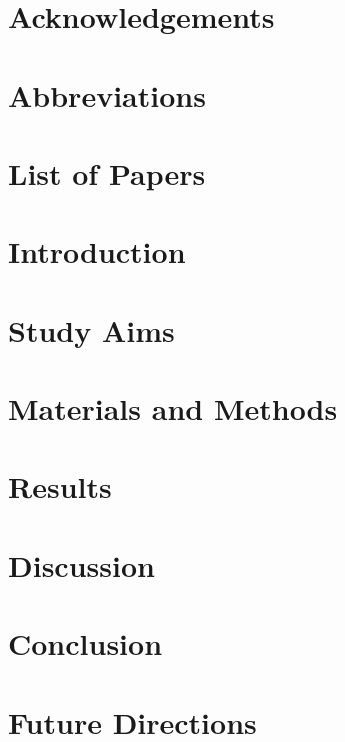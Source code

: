 \documentclass[a4paper, twoside]{report}
\begin{document}
\chapter*{Acknowledgements}


\newpage
\chapter*{Abbreviations}

\newpage

\chapter*{List of Papers}


\tableofcontents
\newpage

\chapter{Introduction}



\chapter{Study Aims}


\chapter{Materials and Methods}



\chapter{Results}



\chapter{Discussion}


\chapter{Conclusion}


\chapter{Future Directions}

\end{document}
